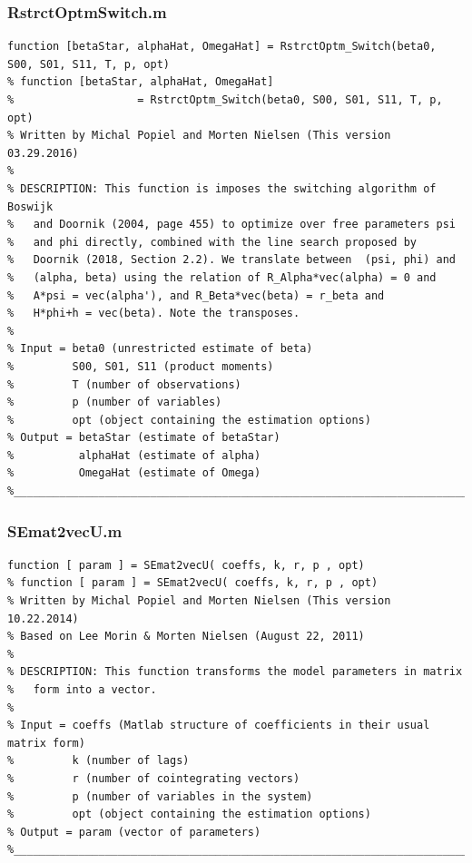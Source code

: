 \documentclass[10pt]{article}
\begin{document}
\subsubsection{RstrctOptm\textunderscore{}Switch.m}
\begin{lstlisting}[frame=single,caption={RstrctOptm\textunderscore{}Switch.m}]
function [betaStar, alphaHat, OmegaHat] = RstrctOptm_Switch(beta0, S00, S01, S11, T, p, opt)
% function [betaStar, alphaHat, OmegaHat] 
%                   = RstrctOptm_Switch(beta0, S00, S01, S11, T, p, opt)
% Written by Michal Popiel and Morten Nielsen (This version 03.29.2016)
% 
% DESCRIPTION: This function is imposes the switching algorithm of Boswijk
%   and Doornik (2004, page 455) to optimize over free parameters psi 
%   and phi directly, combined with the line search proposed by 
%	Doornik (2018, Section 2.2). We translate between  (psi, phi) and 
%	(alpha, beta) using the relation of R_Alpha*vec(alpha) = 0 and 
%	A*psi = vec(alpha'), and R_Beta*vec(beta) = r_beta and 
%	H*phi+h = vec(beta). Note the transposes.
%
% Input = beta0 (unrestricted estimate of beta)
%         S00, S01, S11 (product moments)
%         T (number of observations)
%         p (number of variables)
%         opt (object containing the estimation options)
% Output = betaStar (estimate of betaStar)
%          alphaHat (estimate of alpha)
%          OmegaHat (estimate of Omega)
%_________________________________________________________________________
\end{lstlisting}

\subsubsection{SEmat2vecU.m}
\begin{lstlisting}[frame=single,caption={SEmat2vecU.m}]
function [ param ] = SEmat2vecU( coeffs, k, r, p , opt)
% function [ param ] = SEmat2vecU( coeffs, k, r, p , opt)
% Written by Michal Popiel and Morten Nielsen (This version 10.22.2014)
% Based on Lee Morin & Morten Nielsen (August 22, 2011)
% 
% DESCRIPTION: This function transforms the model parameters in matrix
% 	form into a vector.
%
% Input = coeffs (Matlab structure of coefficients in their usual matrix form)
%         k (number of lags)
%         r (number of cointegrating vectors)
%         p (number of variables in the system)
%         opt (object containing the estimation options)
% Output = param (vector of parameters)
%_________________________________________________________________________
\end{lstlisting}
\end{document}

